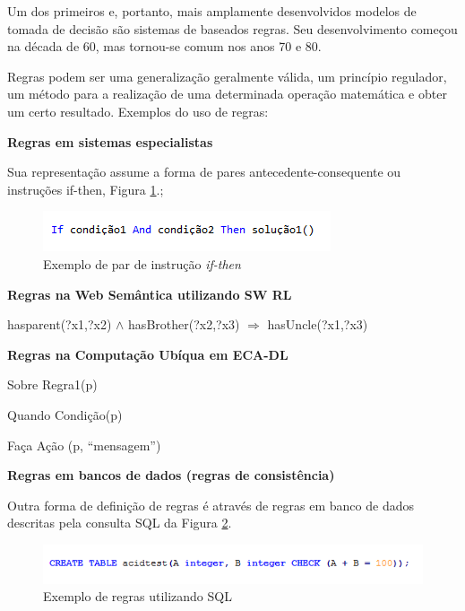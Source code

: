 \documentclass[12pt,a4paper,compsoc]{IEEEtran}
\begin{document}
  Um dos primeiros e, portanto, mais amplamente desenvolvidos modelos de tomada de decisão são
  sistemas de baseados regras. Seu  desenvolvimento começou na década de 60, mas tornou-se comum
  nos anos 70 e 80.
  
  Regras podem ser  uma generalização geralmente válida, um princípio regulador, um método para a
  realização de uma determinada operação matemática e obter um certo resultado. Exemplos do uso de
  regras:
  
  \textbf{Regras em sistemas especialistas}

  Sua representação assume a forma de pares antecedente-consequente ou instruções if-then, Figura
  \ref{if-then}.;

  \begin{figure}[ht]
    \centerline{\includegraphics[scale=1]{imagens/if_then.png}}
    \caption{Exemplo de par de instrução \textit{if-then}}
    \label{if-then}
  \end{figure}
  
  \textbf{Regras na Web Semântica utilizando SW RL}
  
  hasparent(?x1,?x2) $\wedge$ hasBrother(?x2,?x3) $\Rightarrow$ hasUncle(?x1,?x3)

  \textbf{Regras na Computação Ubíqua em ECA-DL}

  Sobre Regra1(p)
  
  Quando Condição(p)
  
  Faça Ação (p, ``mensagem'')


  \textbf{Regras em bancos de dados (regras de consistência)}
  
  Outra forma de definição de regras é através de regras em banco de dados descritas pela consulta SQL
  da Figura \ref{create-table}.
  
  \begin{figure}[ht]
    \centerline{\includegraphics[scale=.6]{imagens/acidtest.png}}
    \caption{Exemplo de regras utilizando SQL}
    \label{create-table}
  \end{figure}
\end{document}

